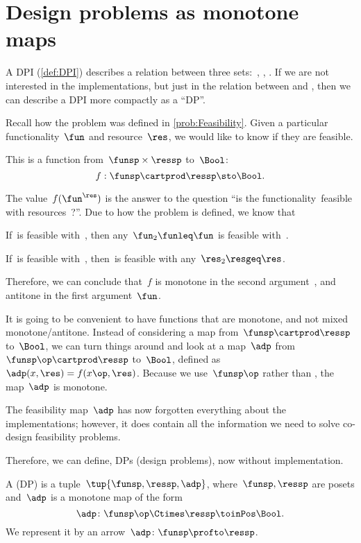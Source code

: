 

\section{Design problems as monotone maps}
\label{sec:dpdefinition}

A DPI (\cref{def:DPI}) describes a relation between three sets:~\funsp, \ressp, \impsp.
If we are not interested in the implementations, but just in the relation between \funsp and \ressp, then we can describe a DPI more compactly as a ``DP''\@.

Recall how the problem \Feasibility was defined in \cref{prob:Feasibility}.
Given a particular functionality~$\fun$ and resource~$\res$, we would like to know if they are feasible.

This is a function from~$\funsp \times \ressp$ to~$\Bool$:
\begin{equation}
  f: \funsp \cartprod \ressp \sto \Bool.
\end{equation}

The value~$f(\fun^\res)$ is the answer to the question ``is the functionality~\fun feasible with resources~\res?''. Due to how the problem is defined, we know that%
\begin{compactenum}
  \item If~\fun is feasible with~\res, then any~$\fun_2 \funleq \fun$ is feasible with~\res.
  \item If~\fun is feasible with~\res, then~\fun is feasible with any~$\res_2 \resgeq \res$.
\end{compactenum}
Therefore, we can conclude that~$f$ is monotone in the second argument~\res, and antitone in the first argument~$\fun$.

It is going to be convenient to have functions that are monotone, and not mixed
monotone/antitone.
Instead of considering a map from~$\funsp \cartprod \ressp$ to~$\Bool$, we can turn things around and look at a map~$\adp$ from~$\funsp\op \cartprod \ressp$ to~$\Bool$, defined as~$\adp(x,\res) = f(x\op,\res)$.
Because we use~$\funsp\op$ rather than \funsp, the map~$\adp$ is monotone.

The feasibility map~$\adp$ has now forgotten everything about the implementations; however, it does contain all the information we need to solve co-design feasibility problems.

Therefore, we can define, DPs (design problems), now without implementation.


\begin{definition}
  \label{def:design-problem}
  A  (DP) is a tuple~$\tup{\funsp, \ressp, \adp}$, where~$\funsp, \ressp$ are posets and~$\adp$ is a monotone map of the form%
  \begin{equation*}
    \label{eq:design_prob_as_monfun}
    \adp \colon  \funsp\op \Ctimes \ressp \toinPos \Bool.
  \end{equation*}
  We represent it by an arrow~$\adp \colon \funsp \profto \ressp$.
\end{definition}

